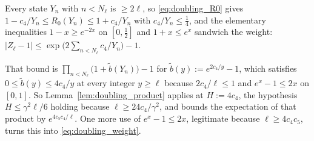 Every state $Y_n$ with $n<N_\ell$ is $\geq2\ell$, so \eqref{eq:doubling_R0} gives
$1-c_4/Y_n\leq R_0(Y_n)\leq1+c_4/Y_n$ with $c_4/Y_n\leq\tfrac14$, and the elementary
inequalities $1-x\geq e^{-2x}$ on $[0,\tfrac12]$ and $1+x\leq e^{x}$ sandwich the weight:
$|Z_\ell-1|\leq\exp\bigl(2\sum_{n<N_\ell}c_4/Y_n\bigr)-1$.

That bound is $\prod_{n<N_\ell}\bigl(1+\widetilde b(Y_n)\bigr)-1$ for
$\widetilde b(y):=e^{2c_4/y}-1$, which satisfies $0\leq\widetilde b(y)\leq4c_4/y$ at every
integer $y\geq\ell$ because $2c_4/\ell\leq1$ and $e^{x}-1\leq2x$ on $[0,1]$. So
Lemma~\ref{lem:doubling_product} applies at $H:=4c_4$, the hypothesis
$H\leq\gamma^2\ell/6$ holding because $\ell\geq24c_4/\gamma^2$, and bounds the expectation of
that product by $e^{4c_5c_4/\ell}$. One more use of $e^{x}-1\leq2x$, legitimate because
$\ell\geq4c_4c_5$, turns this into \eqref{eq:doubling_weight}.
